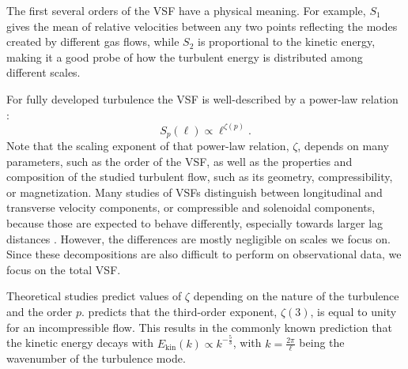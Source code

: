 \documentclass{aa}		%
\begin{document}
The first several orders of the VSF have a physical meaning. 
For example, $\mathit{S}_1$ gives the mean of relative velocities between any two points reflecting the modes created by different gas flows, while $\mathit{S}_2$ is proportional to the kinetic energy, making it a good probe of how the turbulent energy is distributed among different scales.

For fully developed turbulence the VSF is well-described by a power-law relation \citep{Kolmogorov1941,She1994,Boldyrev2002}:
\begin{equation}
	\mathit{S}_p (\ell) \propto \ell^{\zeta(p)}.
	\label{equ:method:propto_zeta}
\end{equation}
Note that the scaling exponent of that power-law relation, $\zeta$, depends on many parameters, such as the order of the VSF, as well as the properties and composition of the studied turbulent flow, such as its geometry, compressibility, or magnetization.
Many studies of VSFs distinguish between longitudinal and transverse velocity components, or compressible and solenoidal components, because those are expected to behave differently, especially towards larger lag distances \citep{Gotoh2002,Schmidt2008,Benzi2010}.
However, the differences are mostly negligible on scales we focus on. 
Since these decompositions are also difficult to perform on observational data, we focus on the total VSF.

Theoretical studies predict values of $\zeta$ depending on the nature of the turbulence and the order $p$.
\citet{Kolmogorov1941} predicts that the third-order exponent, $\zeta(3)$, is equal to unity for an incompressible flow.
This results in the commonly known prediction that the kinetic energy decays with $E_{\mathrm{kin}}(k) \propto k^{-\frac{5}{3}}$, with $k = \frac{2 \pi}{\ell}$ being the wavenumber of the turbulence mode.
\end{document}
